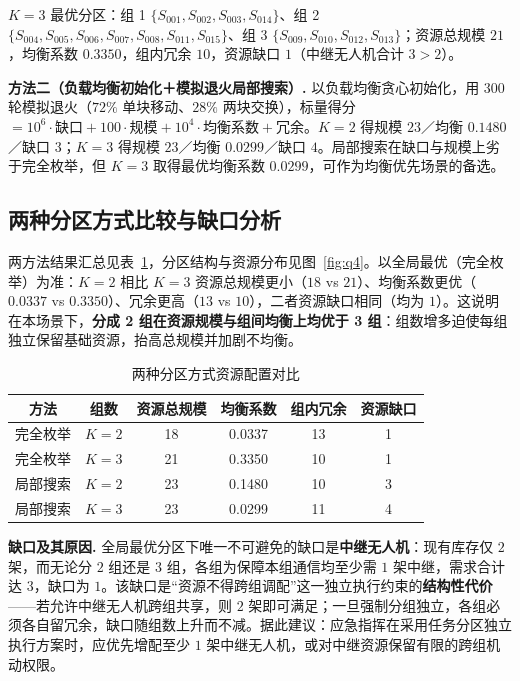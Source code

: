 $K=3$ 最优分区：组 1 $\{S_{001},S_{002},S_{003},S_{014}\}$、组 2 $\{S_{004},S_{005},S_{006},S_{007},S_{008},S_{011},S_{015}\}$、组 3 $\{S_{009},S_{010},S_{012},S_{013}\}$；资源总规模 $21$，均衡系数 $0.3350$，组内冗余 $10$，资源缺口 $1$（中继无人机合计 $3>2$）。

\textbf{方法二（负载均衡初始化＋模拟退火局部搜索）.} 以负载均衡贪心初始化，用 $300$ 轮模拟退火（$72\%$ 单块移动、$28\%$ 两块交换），标量得分 $=10^{6}\cdot\text{缺口}+100\cdot\text{规模}+10^{4}\cdot\text{均衡系数}+\text{冗余}$。$K=2$ 得规模 $23$／均衡 $0.1480$／缺口 $3$；$K=3$ 得规模 $23$／均衡 $0.0299$／缺口 $4$。局部搜索在缺口与规模上劣于完全枚举，但 $K=3$ 取得最优均衡系数 $0.0299$，可作为均衡优先场景的备选。

\subsection{两种分区方式比较与缺口分析}

两方法结果汇总见表~\ref{tab:q4}，分区结构与资源分布见图~\ref{fig:q4}。以全局最优（完全枚举）为准：$K=2$ 相比 $K=3$ 资源总规模更小（$18$ vs $21$）、均衡系数更优（$0.0337$ vs $0.3350$）、冗余更高（$13$ vs $10$），二者资源缺口相同（均为 $1$）。这说明在本场景下，\textbf{分成 2 组在资源规模与组间均衡上均优于 3 组}：组数增多迫使每组独立保留基础资源，抬高总规模并加剧不均衡。

\begin{table}[htbp]
\centering
\caption{两种分区方式资源配置对比}
\label{tab:q4}
\renewcommand{\arraystretch}{1.2}
\begin{tabular}{c|c|c|c|c|c}
\toprule
方法 & 组数 & 资源总规模 & 均衡系数 & 组内冗余 & 资源缺口 \\
\midrule
完全枚举 & $K{=}2$ & 18 & 0.0337 & 13 & 1 \\
完全枚举 & $K{=}3$ & 21 & 0.3350 & 10 & 1 \\
局部搜索 & $K{=}2$ & 23 & 0.1480 & 10 & 3 \\
局部搜索 & $K{=}3$ & 23 & 0.0299 & 11 & 4 \\
\bottomrule
\end{tabular}
\end{table}

\textbf{缺口及其原因.} 全局最优分区下唯一不可避免的缺口是\textbf{中继无人机}：现有库存仅 $2$ 架，而无论分 $2$ 组还是 $3$ 组，各组为保障本组通信均至少需 $1$ 架中继，需求合计达 $3$，缺口为 $1$。该缺口是“资源不得跨组调配”这一独立执行约束的\textbf{结构性代价}——若允许中继无人机跨组共享，则 $2$ 架即可满足；一旦强制分组独立，各组必须各自留冗余，缺口随组数上升而不减。据此建议：应急指挥在采用任务分区独立执行方案时，应优先增配至少 $1$ 架中继无人机，或对中继资源保留有限的跨组机动权限。

